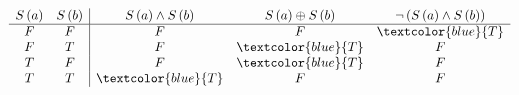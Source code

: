 \begin{equation}
\begin{array}{cc|ccc}
S\left(a\right) & 
S\left(b\right) & 
S\left(a\right) \wedge S\left(b\right) & 
S\left(a\right) \oplus S\left(b\right) & 
\lnot \left( S\left(a\right) \wedge S\left(b\right) \right)
\\
\hline
F & F & F                   & F                       & \textcolor{blue}{T} \\
F & T & F                   &     \textcolor{blue}{T} & F                   \\
T & F & F                   &     \textcolor{blue}{T} & F                   \\
T & T & \textcolor{blue}{T} & F                       & F                   \\
\end{array}
\label{eq:def_equals_table}
\end{equation}

